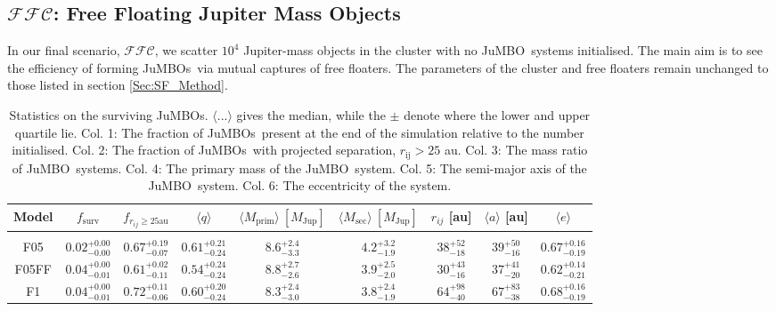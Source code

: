 \documentclass[submission,phys]{lib/SciPost}
\newcommand{\jumbo}{\mbox{JuMBO}}
\newcommand{\jumbos}{\mbox{JuMBOs}}
\begin{document}
    \subsection{$\mathcal{FFC}$: Free Floating Jupiter Mass Objects}
    In our final scenario, $\mathcal{FFC}$, we scatter $10^{4}$
    Jupiter-mass objects in the cluster with no \jumbo\, systems
    initialised. The main aim is to see the efficiency of forming
    \jumbos\, via mutual captures of free floaters. The parameters of
    the cluster and free floaters remain unchanged to those listed in
    section \ref{Sec:SF_Method}.

    \begin{table}
         \caption{Statistics on the surviving \jumbos. $\langle ...\rangle$ gives the median, while the $\pm$ denote where the lower and upper quartile lie. Col. 1: The fraction of \jumbos\, present at the end of the simulation relative to the number initialised. Col. 2: The fraction of \jumbos\, with projected separation, $r_{\mathrm{ij}} > 25$ au. Col. 3: The mass ratio of \jumbo\, systems. Col. 4: The primary mass of the \jumbo\, system. Col. 5: The semi-major axis of the \jumbo\, system. Col. 6: The eccentricity of the system.}
        \label{Tab:SF_Res}
        \centering 
        \begin{tabular}{c c c c c c c c c}
        \hline\hline
        Model & $f_{\mathrm{surv}}$ & $f_{r_{ij} \geq 25\mathrm{ au}}$ & $\langle q\rangle$ & $\langle M_{\mathrm{prim}} \rangle\ [M_{\mathrm{Jup}}]$ & $\langle M_{\mathrm{sec}} \rangle\ [M_{\mathrm{Jup}}]$ & $r_{ij}$ [au] &$\langle a \rangle$ [au] & $\langle e \rangle$\\
        \hline \vspace{-0.75em}\\ 
           F05     & $0.02^{+0.00}_{-0.00}$ & $0.67^{+0.19}_{-0.07}$ & $0.61^{+0.21}_{-0.24}$ & $8.6^{+2.4}_{-3.3}$ & $4.2^{+3.2}_{-1.9}$ & $38^{+52}_{-18}$ & $39^{+50}_{-16}$ & $0.67^{+0.16}_{-0.19}$ \vspace{0.25em}\\
           F05FF   & $0.04^{+0.00}_{-0.01}$ & $0.61^{+0.02}_{-0.11}$ & $0.54^{+0.24}_{-0.24}$ & $8.8^{+2.7}_{-2.6}$ & $3.9^{+2.5}_{-2.0}$ & $30^{+43}_{-16}$ & $37^{+41}_{-20}$ & $0.62^{+0.14}_{-0.21}$ \vspace{0.25em}\\
           F1      & $0.04^{+0.00}_{-0.01}$ & $0.72^{+0.11}_{-0.06}$ & $0.60^{+0.20}_{-0.24}$ & $8.3^{+2.4}_{-3.0}$ & $3.8^{+2.4}_{-1.9}$ & $64^{+98}_{-40}$ & $67^{+83}_{-38}$ & $0.68^{+0.16}_{-0.19}$ \vspace{0.25em}\\

\end{tabular}
\end{table}
\end{document}
